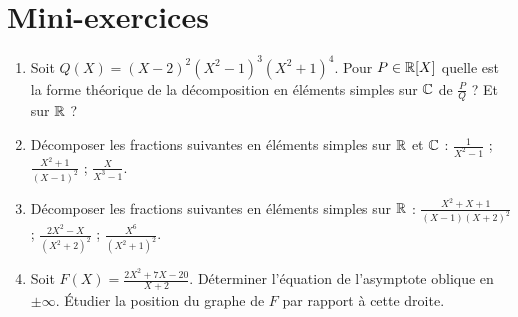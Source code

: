 \section{Mini-exercices}

\begin{frame}

\begin{miniexercice}
\begin{enumerate}
  \item Soit $Q(X)=(X-2)^2(X^2-1)^3(X^2+1)^4$. Pour $P \in \mathbb{R}[X]$ quelle est la forme théorique 
de la décomposition en éléments simples sur $\mathbb{C}$ de $\frac PQ$ ? Et sur $\mathbb{R}$ ?

  \item Décomposer les fractions suivantes en éléments simples sur $\mathbb{R}$ et $\mathbb{C}$ :
$\frac{1}{X^2-1}$ ; $\frac{X^2+1}{(X-1)^2}$ ; $\frac{X}{X^3-1}$.

  \item Décomposer les fractions suivantes en éléments simples sur $\mathbb{R}$ :
$\frac{X^2+X+1}{(X-1)(X+2)^2}$ ; $\frac{2X^2-X}{(X^2+2)^2}$ ; $\frac{X^6}{(X^2+1)^2}$.

  \item Soit $F(X) = \frac{2X^2+7X-20}{X+2}$. 
  Déterminer l'équation de l'asymptote oblique en $\pm \infty$. 
  \'Etudier la position du graphe de $F$ par rapport à cette droite.

\end{enumerate}
\end{miniexercice}

\end{frame}

